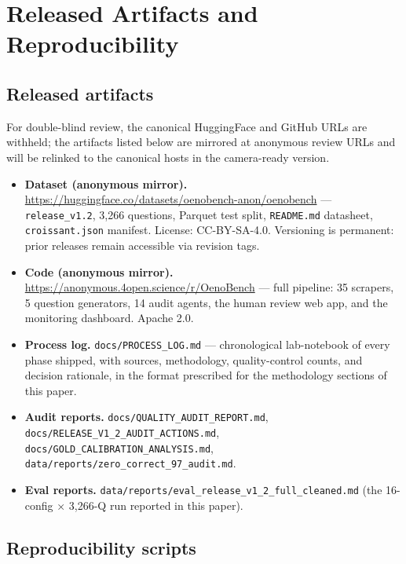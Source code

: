 \section{Released Artifacts and Reproducibility}
\label{app:artifacts}

\subsection{Released artifacts}

For double-blind review, the canonical HuggingFace and GitHub URLs
are withheld; the artifacts listed below are mirrored at anonymous
review URLs and will be relinked to the canonical hosts in the
camera-ready version.

\begin{itemize}\itemsep -1pt
  \item \textbf{Dataset (anonymous mirror).}
    \url{https://huggingface.co/datasets/oenobench-anon/oenobench} —
    \texttt{release\_v1.2}, 3{,}266 questions, Parquet test split,
    \texttt{README.md} datasheet, \texttt{croissant.json} manifest.
    License: CC-BY-SA-4.0. Versioning is permanent: prior releases
    remain accessible via revision tags.
  \item \textbf{Code (anonymous mirror).}
    \url{https://anonymous.4open.science/r/OenoBench} — full
    pipeline: 35 scrapers, 5 question generators, 14 audit agents,
    the human review web app, and the monitoring dashboard.
    Apache 2.0.
  \item \textbf{Process log.} \texttt{docs/PROCESS\_LOG.md} —
    chronological lab-notebook of every phase shipped, with sources,
    methodology, quality-control counts, and decision rationale, in
    the format prescribed for the methodology sections of this paper.
  \item \textbf{Audit reports.} \texttt{docs/QUALITY\_AUDIT\_REPORT.md},
    \texttt{docs/RELEASE\_V1\_2\_AUDIT\_ACTIONS.md},
    \texttt{docs/GOLD\_CALIBRATION\_ANALYSIS.md},
    \texttt{data/reports/zero\_correct\_97\_audit.md}.
  \item \textbf{Eval reports.}
    \texttt{data/reports/eval\_release\_v1\_2\_full\_cleaned.md} (the
    16-config × 3{,}266-Q run reported in this paper).
\end{itemize}

\subsection{Reproducibility scripts}

